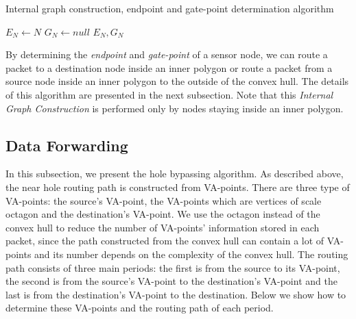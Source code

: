 \begin{algorithm}[!htb]
\SetAlgoLined
\caption{Internal graph construction, endpoint and gate-point determination algorithm}
\label{algo-nhr-endpoint}

 {
	$E_N \leftarrow N$\;
	$G_N \leftarrow null$\;
} 
\Return $E_N, G_N$\;
\end{algorithm}

By determining the \emph{endpoint} and \emph{gate-point} of a sensor node, we can route a packet to a destination node inside an inner polygon or route a packet from a source node inside an inner polygon to the outside of the convex hull. The details of this algorithm are presented in the next subsection. Note that this \emph{Internal Graph Construction} is performed only by nodes staying inside an inner polygon.

\subsection{Data Forwarding}
\label{data-forwarding}
In this subsection, we present the hole bypassing algorithm. As described above, the near hole routing path is constructed from VA-points. There are three type of VA-points: the source's VA-point, the VA-points which are vertices of scale octagon and the destination's VA-point. We use the octagon instead of the convex hull to reduce the number of VA-points' information stored in each packet, since the path constructed from the convex hull can contain a lot of VA-points and its number depends on the complexity of the convex hull. The routing path consists of three main periods: the first is from the source to its VA-point, the second is from the source's VA-point to the destination's VA-point and the last is from the destination's VA-point to the destination. Below we show how to determine these VA-points and the routing path of each period.

